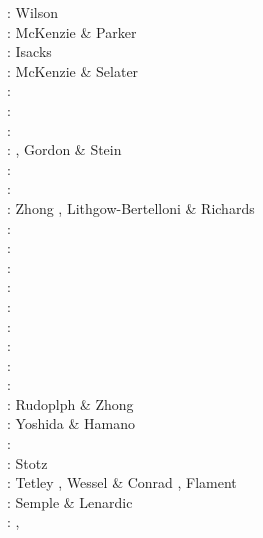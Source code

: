 \nineteensixtysix: Wilson \cite{wils66}\\
\nineteensixtyseven: McKenzie \& Parker \cite{mcpa67}\\
\nineteensixtyeight: Isacks \etal \cite{isos68} \\ 
\nineteenseventythree: McKenzie \& Selater \cite{mcse73}\\
\nineteenseventyfour: \cite{sosl74}\\
\nineteenseventyfive: \cite{harp75}\\
\nineteenninety: \cite{dega90}\\
\nineteenninetytwo: \cite{zieg92a}, Gordon \& Stein \cite{gost92}\\
\nineteenninetyfour: \cite{guto94}\\
\nineteenninetyseven: \cite{wean97b}\\
\nineteenninetyeight: Zhong \etal \cite{zhgm98}, Lithgow-Bertelloni \& Richards \cite{liri98}\\
\nineteenninetynine: \cite{ribr99}\\
\twothousandone: \cite{yohk01}\\
\twothousandtwo: \cite{stoc02}\\
\twothousandthree: \cite{evan03}\cite{reta03}\\
\twothousandseven: \cite{zhzl07}\\
\twothousandnine: \cite{lizh09}\cite{vasv09}\cite{iabu09}\cite{scbs09}\\
\twothousandten: \cite{stto10}\cite{dega10}\\
\twothousandtwelve: \cite{huss12}\cite{gutz12}\cite{qumm12}\cite{holr12}\cite{dost12}\cite{shbs12}\\
\twothousandthirteen: \cite{mosq13}\cite{cost13}\\
\twothousandfourteen: Rudoplph \& Zhong \cite{ruzh14} \\
\twothousandfifteen: Yoshida \& Hamano \cite{yoha15}\\
\twothousandsixteen: \cite{pric16}\\
\twothousandseventeen: Stotz \etal \cite{stid17}\\
\twothousandnineteen: Tetley \etal \cite{tewg19}, Wessel \& Conrad \cite{weco19}, 
                      Flament \cite{flam19}\\
\twothousandtwenty: Semple \& Lenardic \cite{sele20}\\
\twothousandtwentyone: 
\textcite{cafm21},
\textcite{atco21}



